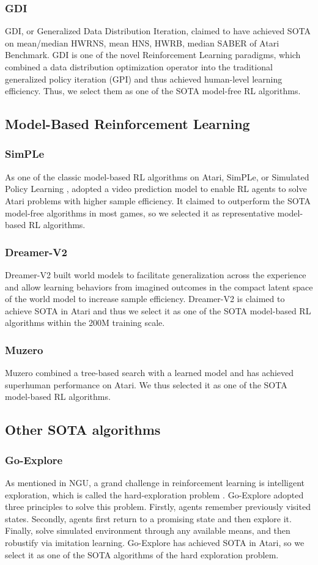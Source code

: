 \documentclass[nohyperref]{article}
\theoremstyle{plain}
\begin{document}
\subsubsection{GDI}
GDI, or Generalized Data Distribution Iteration, claimed to have achieved  SOTA on mean/median HWRNS, mean HNS, HWRB, median SABER of Atari Benchmark. GDI is one of the novel Reinforcement Learning paradigms, which combined a data distribution optimization operator into the traditional generalized policy iteration (GPI) \citep{sutton} and thus achieved human-level learning efficiency.  Thus, we select them as one of the SOTA model-free RL algorithms.


\subsection{Model-Based Reinforcement Learning}
\subsubsection{SimPLe}
As one of the classic model-based RL algorithms on Atari, SimPLe, or Simulated Policy Learning \citep{modelbasedatari}, adopted a video prediction model to enable RL agents to solve Atari problems with higher sample efficiency. It claimed to outperform the SOTA model-free algorithms in most games, so we selected it as representative model-based RL algorithms.
\subsubsection{Dreamer-V2}
Dreamer-V2 \citep{dreamerv2} built world models to facilitate generalization across the experience and allow learning behaviors from imagined outcomes in the compact latent space of the world model to increase sample efficiency. Dreamer-V2 is claimed to achieve SOTA in Atari and thus  we select it as one of the SOTA model-based RL algorithms within the 200M training scale.
\subsubsection{Muzero}
Muzero \citep{muzero} combined a tree-based search with a learned model and has achieved superhuman performance on Atari. We thus selected it as one of the SOTA model-based RL algorithms.
\subsection{Other SOTA algorithms}
\subsubsection{Go-Explore}
As mentioned in NGU, a grand challenge in reinforcement learning is intelligent exploration, which is called the hard-exploration problem \citep{ale2}. Go-Explore \citep{goexplore} adopted three principles to solve this problem. Firstly, agents remember previously visited states. Secondly, agents first return to a promising state and then explore it. Finally, solve simulated environment through any available means, and then robustify via imitation learning. Go-Explore has achieved SOTA in Atari, so we select it as one of the SOTA algorithms of the hard exploration problem.
\end{document}
